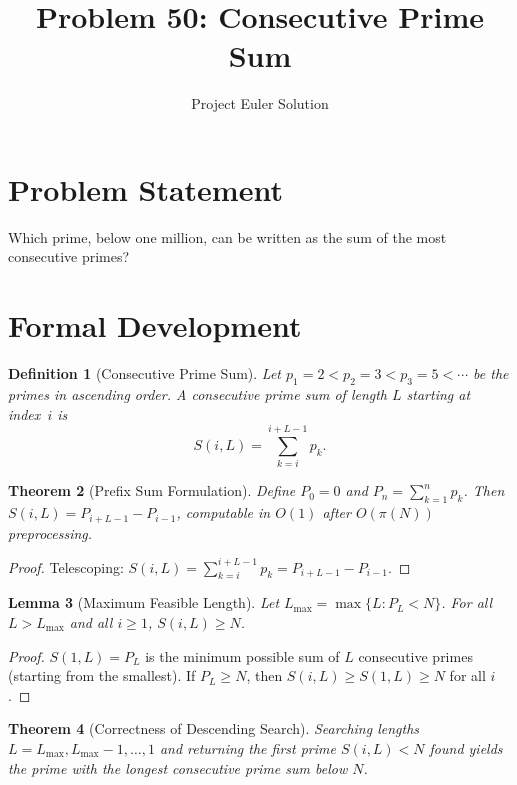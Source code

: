 \documentclass[12pt]{article}
\title{Problem 50: Consecutive Prime Sum}
\author{Project Euler Solution}
\date{}
\newtheorem{theorem}{Theorem}
\newtheorem{lemma}[theorem]{Lemma}
\newtheorem{definition}[theorem]{Definition}
\begin{document}
\maketitle

\section{Problem Statement}

Which prime, below one million, can be written as the sum of the most consecutive primes?

\section{Formal Development}

\begin{definition}[Consecutive Prime Sum]
Let $p_1 = 2 < p_2 = 3 < p_3 = 5 < \cdots$ be the primes in ascending order. A \emph{consecutive prime sum} of length $L$ starting at index~$i$ is
\[
S(i, L) = \sum_{k=i}^{i+L-1} p_k.
\]
\end{definition}

\begin{theorem}[Prefix Sum Formulation]\label{thm:prefix}
Define $P_0 = 0$ and $P_n = \sum_{k=1}^{n} p_k$. Then $S(i, L) = P_{i+L-1} - P_{i-1}$, computable in $O(1)$ after $O(\pi(N))$ preprocessing.
\end{theorem}

\begin{proof}
Telescoping: $S(i,L) = \sum_{k=i}^{i+L-1} p_k = P_{i+L-1} - P_{i-1}$.
\end{proof}

\begin{lemma}[Maximum Feasible Length]\label{lem:maxlen}
Let $L_{\max} = \max\{L : P_L < N\}$. For all $L > L_{\max}$ and all $i \geq 1$, $S(i, L) \geq N$.
\end{lemma}

\begin{proof}
$S(1, L) = P_L$ is the minimum possible sum of $L$ consecutive primes (starting from the smallest). If $P_L \geq N$, then $S(i, L) \geq S(1, L) \geq N$ for all $i$.
\end{proof}

\begin{theorem}[Correctness of Descending Search]\label{thm:correct}
Searching lengths $L = L_{\max}, L_{\max}-1, \ldots, 1$ and returning the first prime $S(i,L) < N$ found yields the prime with the longest consecutive prime sum below $N$.
\end{theorem}
\end{document}

